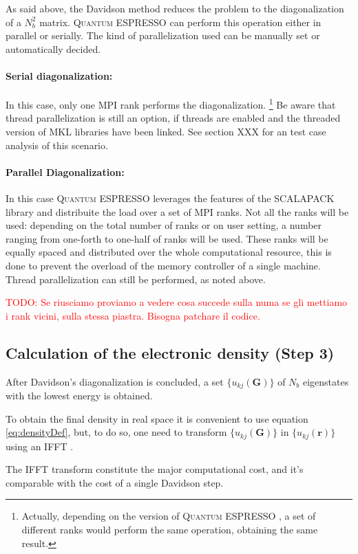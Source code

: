 \documentclass[a4paper,12pt]{article}
\newcommand\mynotes[1]{\begin{flushright}

\textcolor{red}{TODO: #1}\end{flushright}}
\newcommand\erre{\mathbf{r}}
\newcommand\GI{\mathbf{G}}
\newcommand\QE{\textsc{Quantum} ESPRESSO }
\begin{document}
As said above, the Davidson method reduces the problem to the diagonalization of a $N_{b}^2$ matrix.
\QE can perform this operation either in parallel or serially.
The kind of parallelization used can be manually set or automatically decided.

\paragraph{Serial diagonalization: }  In this case, only one MPI rank performs the diagonalization.
\footnote{Actually, depending on the version of \QE, a set of different ranks would perform the same operation, obtaining the same result.}
Be aware that thread parallelization is still an option, if threads are enabled and the threaded version of MKL libraries have been linked.
See section XXX for an test case analysis of this scenario.

\paragraph{Parallel Diagonalization: } In this case \QE leverages the features of the SCALAPACK library and distribuite the load over a set of MPI ranks. 
Not all the ranks will be used: depending on the total number of ranks or on user setting, a number ranging from one-forth to one-half of ranks will be used. 
These ranks will be equally spaced and distributed over the whole computational resource, this is done to prevent the overload of the memory controller of a single machine.
Thread parallelization can still be performed, as noted above.
\mynotes{Se riusciamo proviamo a vedere cosa succede sulla numa se gli mettiamo i rank vicini, sulla stessa piastra. Bisogna patchare il codice.}


\subsection{Calculation of the electronic density (Step 3)}

After Davidson's diagonalization is concluded, a set $\{ u_{kj}(\GI) \}$ of $N_{b}$ eigenstates with the lowest energy is obtained.

To obtain the final density in real space it is convenient to use equation \eqref{eq:densityDef}, but, to do so, one need to transform $\{ u_{kj}(\GI) \}$ in $\{ u_{kj}(\erre) \}$ using an IFFT \cite[p.246]{Martin}.

The IFFT transform constitute the major computational cost, and it's comparable with the cost of a single Davidson step.
\end{document}
